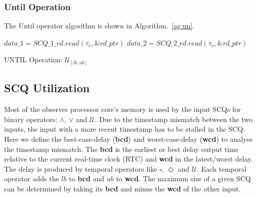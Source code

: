 \subsubsection{Until Operation}
The Until operator algorithm is shown in Algorithm.~\ref{ag:un}.
\begin{algorithm}
\SetAlgoLined
{}
$data\_1 = SCQ\_1\_rd.read(\tau_e,\&rd\_ptr)$\;
$data\_2 = SCQ\_2\_rd.read(\tau_e,\&rd\_ptr)$\;

 \caption{\label{ag:un}UNTIL Operation: $\mathcal{U}_{[lb,ub]}$}
\end{algorithm}




\subsection{SCQ Utilization}
Most of the observer processor core's memory is used by the input SCQs for binary operators: $\wedge$, $\vee$ and $\mathcal{U}$. Due to the timestamp mismatch between the two inputs, the input with a more recent timestamp has to be stalled in the SCQ. Here we define the best-case-delay (\textbf{bcd}) and worst-case-delay (\textbf{wcd}) to analyse the timestamp mismatch. The \textbf{bcd} is the earliest or best delay output time relative to the current real-time clock (RTC) and \textbf{wcd} in the latest/worst delay. The delay is produced by temporal operators like $\square$, $\Diamond$ and $\mathcal{U}$. Each temporal operator adds the $lb$ to \textbf{bcd} and $ub$ to \textbf{wcd}. The maximum size of a given SCQ can be determined by taking its \textbf{bcd} and minus the \textbf{wcd} of the other input.\par


